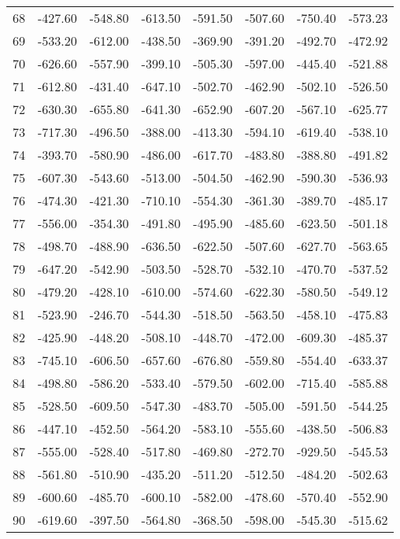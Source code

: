 \begin{longtable}{rrrrrrrr}
68 & -427.60 & -548.80 & -613.50 & -591.50 & -507.60 & -750.40 & -573.23  \\
69 & -533.20 & -612.00 & -438.50 & -369.90 & -391.20 & -492.70 & -472.92  \\
70 & -626.60 & -557.90 & -399.10 & -505.30 & -597.00 & -445.40 & -521.88  \\
71 & -612.80 & -431.40 & -647.10 & -502.70 & -462.90 & -502.10 & -526.50  \\
72 & -630.30 & -655.80 & -641.30 & -652.90 & -607.20 & -567.10 & -625.77  \\
73 & -717.30 & -496.50 & -388.00 & -413.30 & -594.10 & -619.40 & -538.10  \\
74 & -393.70 & -580.90 & -486.00 & -617.70 & -483.80 & -388.80 & -491.82  \\
75 & -607.30 & -543.60 & -513.00 & -504.50 & -462.90 & -590.30 & -536.93  \\
76 & -474.30 & -421.30 & -710.10 & -554.30 & -361.30 & -389.70 & -485.17  \\
77 & -556.00 & -354.30 & -491.80 & -495.90 & -485.60 & -623.50 & -501.18  \\
78 & -498.70 & -488.90 & -636.50 & -622.50 & -507.60 & -627.70 & -563.65  \\
79 & -647.20 & -542.90 & -503.50 & -528.70 & -532.10 & -470.70 & -537.52  \\
80 & -479.20 & -428.10 & -610.00 & -574.60 & -622.30 & -580.50 & -549.12  \\
81 & -523.90 & -246.70 & -544.30 & -518.50 & -563.50 & -458.10 & -475.83  \\
82 & -425.90 & -448.20 & -508.10 & -448.70 & -472.00 & -609.30 & -485.37  \\
83 & -745.10 & -606.50 & -657.60 & -676.80 & -559.80 & -554.40 & -633.37  \\
84 & -498.80 & -586.20 & -533.40 & -579.50 & -602.00 & -715.40 & -585.88  \\
85 & -528.50 & -609.50 & -547.30 & -483.70 & -505.00 & -591.50 & -544.25  \\
86 & -447.10 & -452.50 & -564.20 & -583.10 & -555.60 & -438.50 & -506.83  \\
87 & -555.00 & -528.40 & -517.80 & -469.80 & -272.70 & -929.50 & -545.53  \\
88 & -561.80 & -510.90 & -435.20 & -511.20 & -512.50 & -484.20 & -502.63  \\
89 & -600.60 & -485.70 & -600.10 & -582.00 & -478.60 & -570.40 & -552.90  \\
90 & -619.60 & -397.50 & -564.80 & -368.50 & -598.00 & -545.30 & -515.62  \\

\end{longtable}
